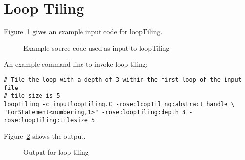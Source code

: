 \section{Loop Tiling}
Figure~\ref{Tutorial:exampleInputCode_LoopTilingp} gives an example
input code for loopTiling.

\begin{figure}[!h]
{\indent
  {\mySmallFontSize
      \begin{latexonly}
    
    \end{latexonly}
      \begin{htmlonly}
    
    \end{htmlonly}
  }
}
\caption{Example source code used as input to loopTiling}
    \label{Tutorial:exampleInputCode_LoopTilingp}
\end{figure}


An example command line to invoke loop tiling:
\begin{verbatim}
# Tile the loop with a depth of 3 within the first loop of the input file 
# tile size is 5
loopTiling -c inputloopTiling.C -rose:loopTiling:abstract_handle \
"ForStatement<numbering,1>" -rose:loopTiling:depth 3 -rose:loopTiling:tilesize 5

\end{verbatim}
Figure~\ref{Tutorial:exampleOutput_LoopTilingp} shows the output.
\begin{figure}[!h]
{\indent
  {\mySmallFontSize
      \begin{latexonly}
    
    \end{latexonly}
      \begin{htmlonly}
    
    \end{htmlonly}
  }
}
\caption{Output for loop tiling}
    \label{Tutorial:exampleOutput_LoopTilingp}
\end{figure}


